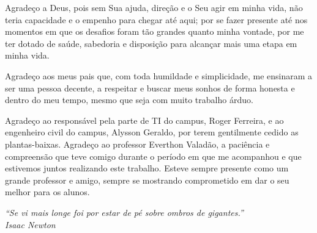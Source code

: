 \documentclass[
	12pt,				%
	twoside,			%
	a4paper,			%
	english,			%
	french,				%
	spanish,			%
	brazil				%
	]{abntex2}
\begin{document}
\begin{agradecimentos}

Agradeço a Deus, pois sem Sua ajuda, direção e o Seu agir em minha vida,
não teria capacidade e o empenho para chegar até aqui; por se fazer
presente até nos momentos em que os desafios foram tão grandes quanto
minha vontade, por me ter dotado de saúde, sabedoria e disposição para
alcançar mais uma etapa em minha vida.

Agradeço aos meus pais que, com toda humildade e simplicidade, me
ensinaram a ser uma pessoa decente, a respeitar e buscar meus sonhos de
forma honesta e dentro do meu tempo, mesmo que seja com muito trabalho
árduo.

Agradeço ao responsável pela parte de TI do campus, Roger Ferreira, e ao
engenheiro civil do campus, Alysson Geraldo, por terem gentilmente
cedido as plantas-baixas. Agradeço ao professor Everthon Valadão, a
paciência e compreensão que teve comigo durante o período em que me
acompanhou e que estivemos juntos realizando este trabalho. Esteve
sempre presente como um grande professor e amigo, sempre se mostrando
comprometido em dar o seu melhor para os alunos.

\end{agradecimentos}
\begin{epigrafe}
    \vspace*{\fill}
	\begin{flushright}

  \emph{``Se vi mais longe foi por estar de pé sobre ombros de
  gigantes.''\\
  Isaac Newton}

	\end{flushright}
\end{epigrafe}

\end{document}
